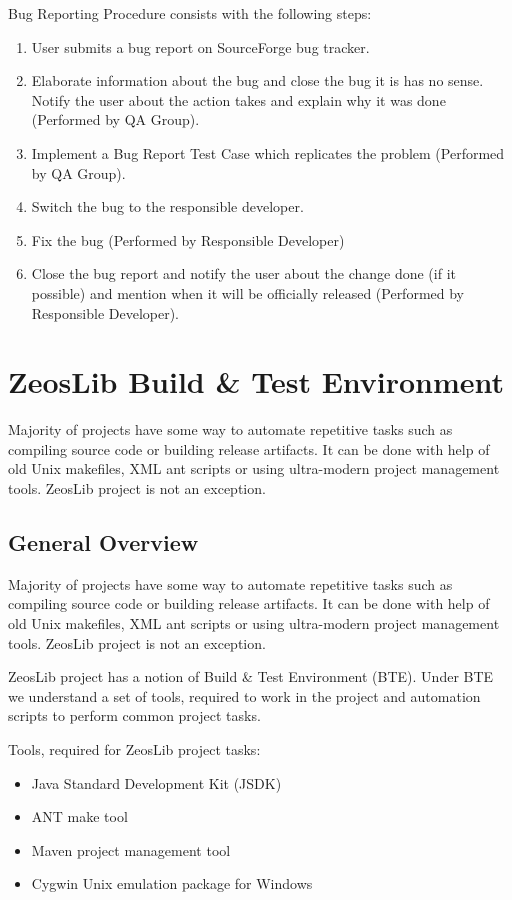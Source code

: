 \documentclass[a4paper,12pt,oneside]{book}
\begin{document}
Bug Reporting Procedure consists with the following steps:
\begin{enumerate}
  \item User submits a bug report on SourceForge bug tracker.
	\item
	  Elaborate information about the bug and close the bug it is has no sense.
		Notify the user about the action takes and explain why it was done (Performed by QA Group).
	\item Implement a Bug Report Test Case which replicates the problem (Performed by QA Group).
	\item Switch the bug to the responsible developer.
	\item Fix the bug (Performed by Responsible Developer)
	\item Close the bug report and notify the user about the change done (if it possible) and mention when it will be officially released (Performed by Responsible Developer).
\end{enumerate}

\chapter{ZeosLib Build \& Test Environment}

Majority of projects have some way to automate repetitive tasks such as compiling source code or building release artifacts.
It can be done with help of old Unix makefiles, XML ant scripts or using ultra-modern project management tools.
ZeosLib project is not an exception.

\section{General Overview}
Majority of projects have some way to automate repetitive tasks such as compiling source code or building release artifacts.
It can be done with help of old Unix makefiles, XML ant scripts or using ultra-modern project management tools.
ZeosLib project is not an exception.

ZeosLib project has a notion of Build \& Test Environment (BTE).
Under BTE we understand a set of tools, required to work in the project and automation scripts to perform common project tasks.

Tools, required for ZeosLib project tasks:
\begin{itemize}
  \item Java Standard Development Kit (JSDK)
	\item ANT make tool
	\item Maven project management tool
	\item Cygwin Unix emulation package for Windows
\end{itemize}
\end{document}
